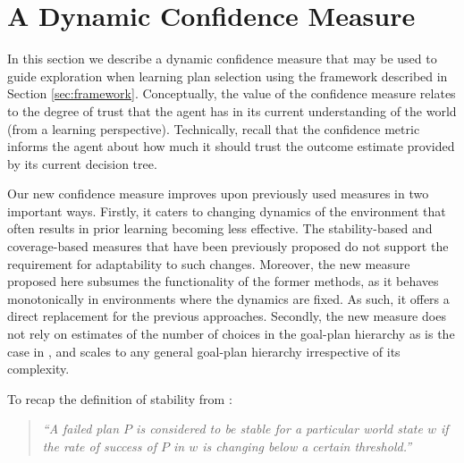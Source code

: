 \section{A Dynamic Confidence Measure}\label{sec:confidence}

In this section we describe a dynamic confidence measure that may be used to guide exploration when learning plan selection using the framework described in Section \ref{sec:framework}. Conceptually, the value of the confidence measure relates to the degree of trust that the agent has in its current understanding of the world (from a learning perspective). Technically, recall that the confidence metric informs the agent about how much it should trust the outcome estimate provided by its current decision tree.

Our new confidence measure improves upon previously used measures in two important ways. 
%
Firstly, it caters to changing dynamics of the environment that often results in prior learning becoming less effective. The stability-based \cite{airiau09:enhancing} and coverage-based \cite{singh10:extending,singh10:learning} measures that have been previously proposed do not support the requirement for adaptability to such changes. Moreover, the new measure proposed here subsumes the functionality of the former methods, as it behaves monotonically in environments where the dynamics are fixed. As such, it offers a direct replacement for the previous approaches. 
%
Secondly, the new measure does not rely on estimates of the number of choices in the goal-plan hierarchy as is the case in \cite{singh10:extending,singh10:learning}, and scales to any general goal-plan hierarchy irrespective of its complexity.


To recap the definition of stability from \cite{singh10:learning}:

\begin{quote}
\emph{``A failed plan $P$ is considered to be stable for a particular world state $w$ if the rate of success of $P$ in $w$ is changing below a certain threshold.''}
\end{quote} 

\newcommand{\ds}{\zeta}
\newcommand{\app}{\mathname{app}}
\newcommand{\stable}{\mathname{stable}}

